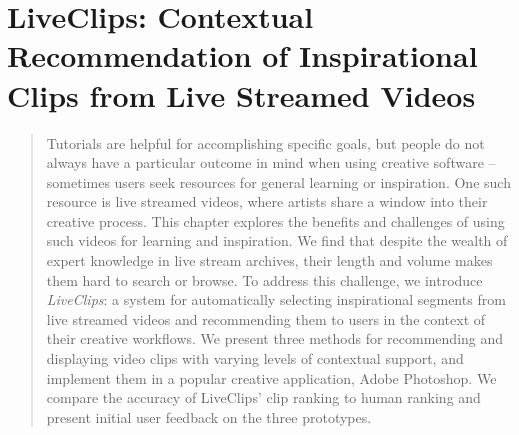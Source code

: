 \chapter{LiveClips: Contextual Recommendation of Inspirational Clips from Live Streamed Videos}
\label{chapter:liveclips}
\begin{quote}
Tutorials are helpful for accomplishing specific goals, but people do not always have a particular outcome in mind when using creative software -- sometimes users seek resources for general learning or inspiration. One such resource is live streamed videos, where artists share a window into their creative process. This chapter explores the benefits and challenges of using such videos for learning and inspiration.
We find that despite the wealth of expert knowledge in live stream archives, their length and volume makes them hard to search or browse. To address this challenge, we introduce \textit{LiveClips}: a system for automatically selecting inspirational segments from live streamed videos and recommending them to users in the context of their creative workflows. We present three methods for recommending and displaying video clips with varying levels of contextual support, and implement them in a popular creative application, Adobe Photoshop. We compare the accuracy of LiveClips' clip ranking to human ranking and present initial user feedback on the three prototypes.
\end{quote}









